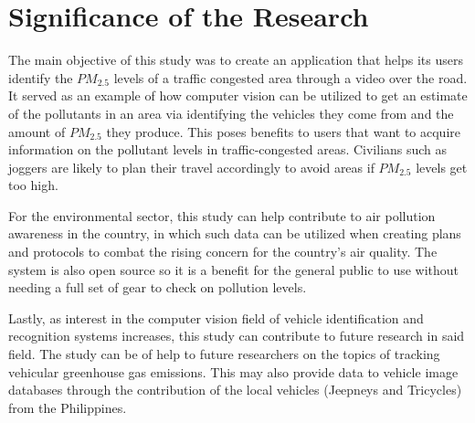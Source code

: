 \section{Significance of the Research}
\label{sec:significance}

The main objective of this study was to create an application that helps its users identify the $PM_{2.5}$ levels of a traffic congested area through a video over the road. It served as an example of how computer vision can be utilized to get an estimate of the pollutants in an area via identifying the vehicles they come from and the amount of $PM_{2.5}$ they produce. This poses benefits to users that want to acquire information on the pollutant levels in traffic-congested areas. Civilians such as joggers are likely to plan their travel accordingly to avoid areas if $PM_{2.5}$ levels get too high.

For the environmental sector, this study can help contribute to air pollution awareness in the country, in which such data can be utilized when creating plans and protocols to combat the rising concern for the country’s air quality. The system is also open source so it is a benefit for the general public to use without needing a full set of gear to check on pollution levels.

Lastly, as interest in the computer vision field of vehicle identification and recognition systems increases, this study can contribute to future research in said field. The study can be of help to future researchers on the topics of tracking vehicular greenhouse gas emissions. This may also provide data to vehicle image databases through the contribution of the local vehicles (Jeepneys and Tricycles) from the Philippines.




\begin{comment}
If applicable, describe possible commercialization and/or innovation in your research.
\end{comment}


